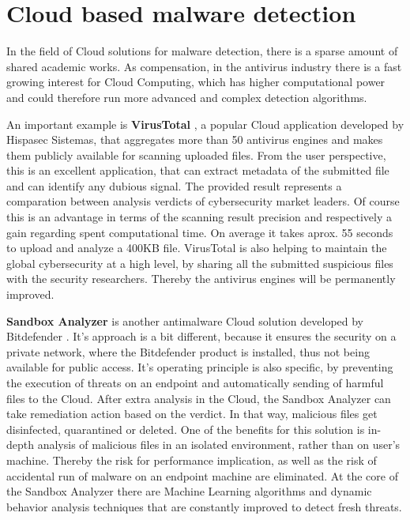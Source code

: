 \section{Cloud based malware detection}
\label{section:relatedWorkCloud}
In the field of Cloud solutions for malware detection, there is a sparse amount of shared academic works. As compensation, in the antivirus industry there is a fast growing interest for Cloud Computing, which has higher computational power and could therefore run more advanced and complex detection algorithms. \par
An important example is \textbf{VirusTotal} \cite{virustotal}, a popular Cloud application developed by Hispasec Sistemas, that aggregates more than 50 antivirus engines and makes them publicly available for scanning uploaded files. From the user perspective, this is an excellent application, that can extract metadata of the submitted file and can identify any dubious signal. The provided result represents a comparation between analysis verdicts of cybersecurity market leaders. Of course this is an advantage in terms of the scanning result precision and respectively a gain regarding spent computational time. On average it takes aprox. 55 seconds to upload and analyze a 400KB file. VirusTotal is also helping to maintain the global cybersecurity at a high level, by sharing all the submitted suspicious files with the security researchers. Thereby the antivirus engines will be permanently improved. \par
\textbf{Sandbox Analyzer} is another antimalware Cloud solution developed by Bitdefender \cite{bdSandbox}. It's approach is a bit different, because it
ensures the security on a private network, where the Bitdefender product is installed, thus not being available for public access. It's operating principle is also specific, by preventing the execution of threats on an endpoint and automatically sending of harmful files to the Cloud. After extra analysis in the Cloud, the Sandbox Analyzer can take remediation action based on the verdict. In that way, malicious files get disinfected, quarantined or deleted. One of the benefits for this solution is in-depth analysis of malicious files in an isolated environment, rather than on user's machine. Thereby the risk for performance implication, as well as the risk of accidental run of malware on an endpoint machine are eliminated. At the core of the Sandbox Analyzer there are Machine Learning algorithms and dynamic behavior analysis techniques that are constantly improved to detect fresh threats.

